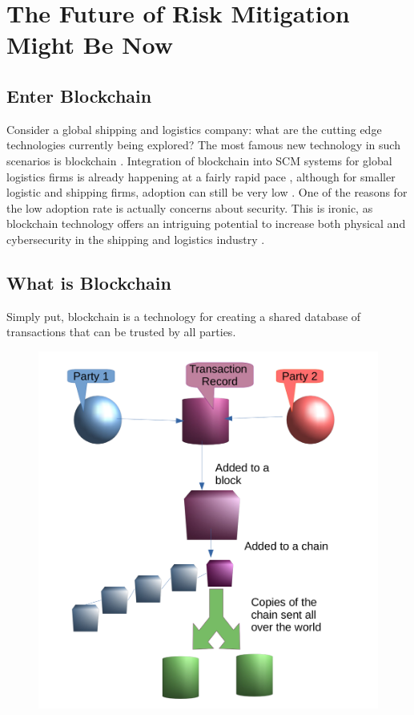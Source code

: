 \documentclass[floatsintext,stu]{apa7}
\begin{document}
\section{The Future of Risk Mitigation Might Be Now}
\label{sec:orgec4da04}

\subsection{Enter Blockchain}
\label{sec:orga9c77eb}

Consider a global shipping and logistics company: what are the cutting edge technologies currently being explored? The most famous new technology in such scenarios is blockchain  \cite{litkeBlockchainsSupplyChain2019}. Integration of blockchain into SCM systems for global logistics firms is already happening at a fairly rapid pace \cite{groenfeldtIBMMaerskApply2017}, although for smaller logistic and shipping firms, adoption can still be very low \cite{papathanasiouNonApplicationBlockchain2020}. One of the reasons for the low adoption rate is actually concerns about security. This is ironic, as blockchain technology offers an intriguing potential to increase both physical and cybersecurity in the shipping and logistics industry \cite{xuBindingPhysicalCyber2018}.

\subsection{What is Blockchain}
\label{sec:org987b9d5}

Simply put, blockchain is a technology for creating a shared database of transactions that can be trusted by all parties.

\begin{figure}[h]
\includegraphics[width=.8\textwidth]{diagram}
\end{figure}
\end{document}
